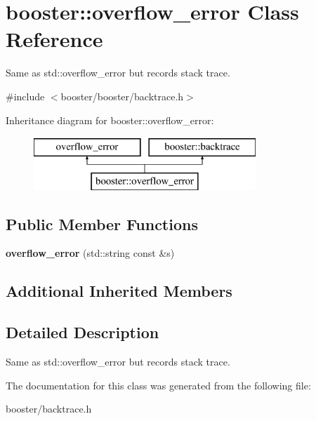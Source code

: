 \section{booster\+:\+:overflow\+\_\+error Class Reference}
\label{classbooster_1_1overflow__error}


Same as std\+::overflow\+\_\+error but records stack trace.  




{\ttfamily \#include $<$booster/booster/backtrace.\+h$>$}

Inheritance diagram for booster\+:\+:overflow\+\_\+error\+:\begin{figure}[H]
\begin{center}
\leavevmode
\includegraphics[height=2.000000cm]{classbooster_1_1overflow__error}
\end{center}
\end{figure}
\subsection*{Public Member Functions}
\begin{DoxyCompactItemize}
\item 
{\bfseries overflow\+\_\+error} (std\+::string const \&s)\label{classbooster_1_1overflow__error_afc09cb72a93db7b1002f757ab4d8e1ad}

\end{DoxyCompactItemize}
\subsection*{Additional Inherited Members}


\subsection{Detailed Description}
Same as std\+::overflow\+\_\+error but records stack trace. 

The documentation for this class was generated from the following file\+:\begin{DoxyCompactItemize}
\item 
booster/backtrace.\+h\end{DoxyCompactItemize}
